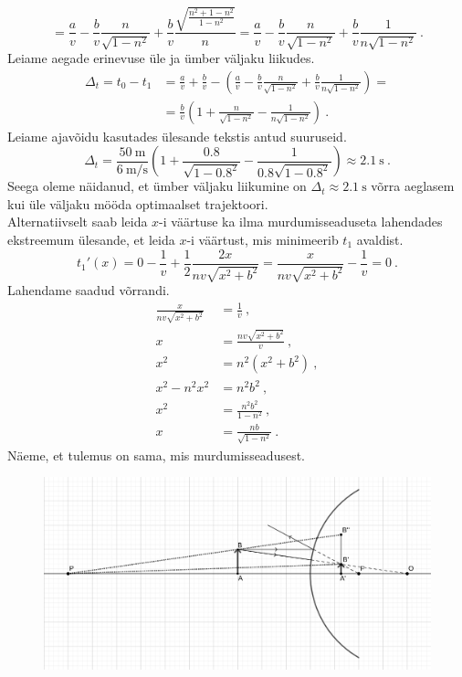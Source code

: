 \documentclass[10pt]{article}
\begin{document}
\[
    = \frac{a}{v} - \frac{b}{v} \frac{n}{\sqrt{1-n^2}} + \frac{b}{v} \frac{\sqrt{\frac{n^2 + 1 - n^2}{1-n^2}}}{n} = \frac{a}{v} - \frac{b}{v} \frac{n}{\sqrt{1-n^2}} + \frac{b}{v} \frac{1}{n\sqrt{1-n^2}} \ .
\]
Leiame aegade erinevuse üle ja ümber väljaku liikudes.
\begin{align*}
    \Delta_t = t_0 - t_1 &= \frac{a}{v} + \frac{b}{v} - \left( \frac{a}{v} - \frac{b}{v} \frac{n}{\sqrt{1-n^2}} + \frac{b}{v} \frac{1}{n\sqrt{1-n^2}} \right) = \\
    &= \frac{b}{v} \left( 1 + \frac{n}{\sqrt{1-n^2}} - \frac{1}{n\sqrt{1-n^2}} \right) \ .
\end{align*}
Leiame ajavõidu kasutades ülesande tekstis antud suuruseid.
\[
    \Delta_t = \frac{\SI{50}{\metre}}{\SI{6}{\metre\per\second}} \left( 1 + \frac{\num{0.8}}{\sqrt{1-\num{0.8}^2}} - \frac{1}{\num{0.8}\sqrt{1-\num{0.8}^2}} \right) \approx \SI{2.1}{\second} \ .
\]
Seega oleme näidanud, et ümber väljaku liikumine on \(\Delta_t \approx \SI{2.1}{\second}\) võrra aeglasem kui üle väljaku mööda optimaalset trajektoori. \\

Alternatiivselt saab leida \(x\)-i väärtuse ka ilma murdumisseaduseta lahendades ekstreemum ülesande, et leida \(x\)-i väärtust, mis minimeerib \(t_1\) avaldist.
\[
    t_1'(x) = 0 - \frac{1}{v} + \frac{1}{2} \frac{2x}{nv\sqrt{x^2 + b^2}} = \frac{x}{nv\sqrt{x^2 + b^2}} - \frac{1}{v} = 0 \ .
\]
Lahendame saadud võrrandi.
\begin{align*}
    \frac{x}{nv\sqrt{x^2 + b^2}} &= \frac{1}{v} \ , \\
    x &= \frac{nv\sqrt{x^2 + b^2}}{v} \ , \\
    x^2 &= n^2 (x^2 + b^2) \ , \\
    x^2 - n^2 x^2 &= n^2 b^2 \ , \\
    x^2 &= \frac{n^2 b^2}{1 - n^2} \ , \\
    x &= \frac{nb}{\sqrt{1 - n^2}} \ .
\end{align*}
Näeme, et tulemus on sama, mis murdumisseadusest.
\probend
\bigskip


\solu
\begin{figure}[h]
    \centering
    \includegraphics[width=\linewidth]{2023-lahg-02-yl.png}
\end{figure}
\end{document}
